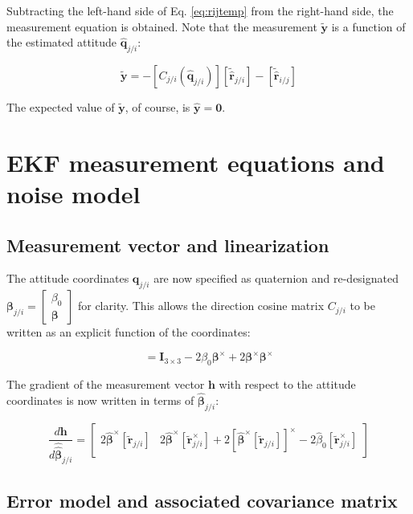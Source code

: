 \documentclass{aiaa-tc}
\newcommand{\B}[1]{\textbf{#1}} %
\newcommand{\U}[1]{\hat{\textbf{#1}}} %
\newcommand{\BG}[1]{{\bm #1}}           %
\newcommand{\ddarg}[2]{\frac{d#1}{d#2}} %
\begin{document}
Subtracting the left-hand side of Eq. \ref{eq:rijtemp} from the right-hand side, the measurement equation is obtained. Note that the measurement $\tilde{\B{y}}$ is a function of the estimated attitude $\hat{\B{q}}_{j/i}$:

\begin{equation}
\tilde{\B{y}} = -[C_{j/i}(\hat{\B{q}}_{j/i})][\tilde{\U{r}}_{j/i}] - [\tilde{\U{r}}_{i/j}]
\label{eq:ytilde}
\end{equation}

The expected value of $\tilde{\B{y}}$, of course, is $\hat{\B{y}} = \B{0}$.

\section{ EKF measurement equations and noise model }

\subsection{Measurement vector and linearization}

The attitude coordinates $\B{q}_{j/i}$ are now specified as quaternion and re-designated $\BG{\beta}_{j/i} = \begin{bmatrix}
\beta_0 \\
\BG{\beta}
\end{bmatrix}$ for clarity. This allows the direction cosine matrix $C_{j/i}$ to be written as an explicit function of the coordinates:

\begin{equation}
[C_{j/i}(\BG{\beta}_{j/i})] = \B{I}_{3 \times 3} - 2\beta_0 \BG{\beta}^\times + 2\BG{\beta}^\times\BG{\beta}^\times
\end{equation}

The gradient of the measurement vector $\B{h}$ with respect to the attitude coordinates is now written in terms of $\hat{\BG{\beta}}_{j/i}$:

\begin{equation}
\ddarg{\B{h}}{\hat{\hat{\BG{\beta}}}_{j/i}} = \begin{bmatrix}
2\hat{\BG{\beta}}^\times [\tilde{\B{r}}_{j/i}] & 2\hat{\BG{\beta}}^\times[\tilde{\B{r}}_{j/i}^\times] + 2[\hat{\BG{\beta}}^\times [\tilde{\B{r}}_{j/i}]]^\times - 2\hat{\beta}_0 [\tilde{\B{r}}_{j/i}^\times]
\end{bmatrix}
\label{eq:HlinDef}
\end{equation}

\subsection{Error model and associated covariance matrix}
\end{document}
